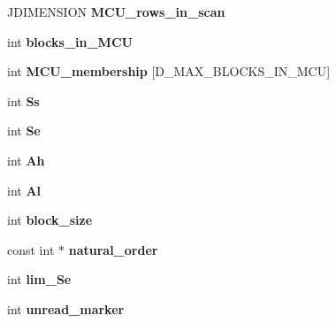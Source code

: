 \begin{DoxyCompactItemize}
J\+D\+I\+M\+E\+N\+S\+I\+ON {\bfseries M\+C\+U\+\_\+rows\+\_\+in\+\_\+scan}
\item 
\mbox{\label{structjpeg__decompress__struct_a9a566432e939703e277a38a9cc9c60f4}} 
int {\bfseries blocks\+\_\+in\+\_\+\+M\+CU}
\item 
\mbox{\label{structjpeg__decompress__struct_a9f56ae7904b4d1ce61c370449b421fda}} 
int {\bfseries M\+C\+U\+\_\+membership} \mbox{[}D\+\_\+\+M\+A\+X\+\_\+\+B\+L\+O\+C\+K\+S\+\_\+\+I\+N\+\_\+\+M\+CU\mbox{]}
\item 
\mbox{\label{structjpeg__decompress__struct_ab260a491c6fc19739138894ab7deff0d}} 
int {\bfseries Ss}
\item 
\mbox{\label{structjpeg__decompress__struct_aa48ad5a8248eacc3a1e32f83d8e042ad}} 
int {\bfseries Se}
\item 
\mbox{\label{structjpeg__decompress__struct_a0ce329c8f2fc5df5afd401632623c4a5}} 
int {\bfseries Ah}
\item 
\mbox{\label{structjpeg__decompress__struct_a1e16717d692de3473ea3bb49a75fbb60}} 
int {\bfseries Al}
\item 
\mbox{\label{structjpeg__decompress__struct_a70b27761c7d0bd5cd90f4fe47e569b94}} 
int {\bfseries block\+\_\+size}
\item 
\mbox{\label{structjpeg__decompress__struct_a9ee4354f5e70294952b4879365785f1e}} 
const int $\ast$ {\bfseries natural\+\_\+order}
\item 
\mbox{\label{structjpeg__decompress__struct_ac9e9efb1e3538ba1aa53c625ee23b360}} 
int {\bfseries lim\+\_\+\+Se}
\item 
\mbox{\label{structjpeg__decompress__struct_a5f2f9ceff6b1c0879405c7ce61ca2997}} 
int {\bfseries unread\+\_\+marker}
\item 
\mbox{\label{structjpeg__decompress__struct_acd866461afacb65a1098045c4ab3a262}} 

\end{DoxyCompactItemize}
